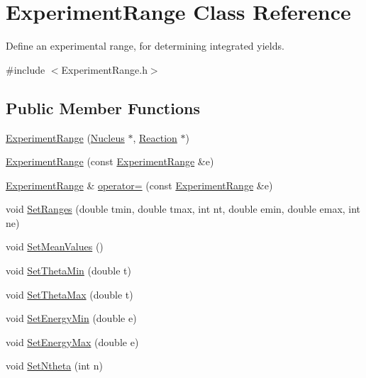 \hypertarget{classExperimentRange}{\section{Experiment\-Range Class Reference}
\label{classExperimentRange}
}


Define an experimental range, for determining integrated yields.  




{\ttfamily \#include $<$Experiment\-Range.\-h$>$}

\subsection*{Public Member Functions}
\begin{DoxyCompactItemize}
\item 
\hyperlink{classExperimentRange_a79480db17f0803e470c5f7100c84f8c8}{Experiment\-Range} (\hyperlink{classNucleus}{Nucleus} $\ast$, \hyperlink{classReaction}{Reaction} $\ast$)
\item 
\hyperlink{classExperimentRange_a092597ab070b91bab8bba8b171d39fda}{Experiment\-Range} (const \hyperlink{classExperimentRange}{Experiment\-Range} \&e)
\item 
\hyperlink{classExperimentRange}{Experiment\-Range} \& \hyperlink{classExperimentRange_a241106c9e2ecdd984b3ed38987f439bd}{operator=} (const \hyperlink{classExperimentRange}{Experiment\-Range} \&e)
\item 
void \hyperlink{classExperimentRange_ac555c2d40c99276a6d4bd07da5e3be78}{Set\-Ranges} (double tmin, double tmax, int nt, double emin, double emax, int ne)
\item 
void \hyperlink{classExperimentRange_a0e190c12e091608e70d44695f946c7c9}{Set\-Mean\-Values} ()
\item 
void \hyperlink{classExperimentRange_a51a02e7749c55efd3472caee94bbebfd}{Set\-Theta\-Min} (double t)
\item 
void \hyperlink{classExperimentRange_a27480c691bbabbef1bb6bafe179a0b34}{Set\-Theta\-Max} (double t)
\item 
void \hyperlink{classExperimentRange_aa417df7503c9300f44dc7c8677ef03e5}{Set\-Energy\-Min} (double e)
\item 
void \hyperlink{classExperimentRange_ab5615404ef5cdb6dfcc6b559f9803b1c}{Set\-Energy\-Max} (double e)
\item 
void \hyperlink{classExperimentRange_a50732f0b47ee0db8609339e6c48011d4}{Set\-Ntheta} (int n)
\item 

\end{DoxyCompactItemize}
